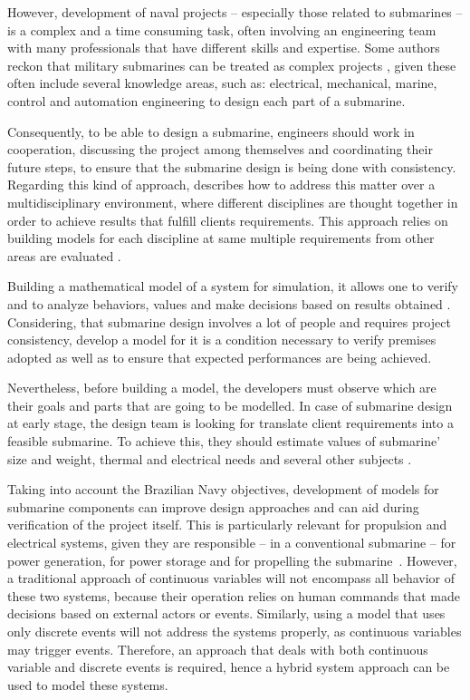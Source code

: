 \documentclass[10pt,fleqn,a4paper,twoside]{article}
\begin{document}
	However, development of naval projects -- especially those related to submarines -- is a complex and a time consuming task, often involving an engineering team with many professionals that have different skills and expertise. Some authors reckon that military submarines can be treated as complex projects \citep{Chalfant2015} \citep{Cooper2017}, given these often include several knowledge areas, such as: electrical, mechanical, marine, control and automation engineering to design each part of a submarine.
	
	Consequently, to be able to design a submarine, engineers should work in cooperation, discussing the project among themselves and coordinating their future steps, to ensure that the submarine design is being done with consistency. Regarding this kind of approach, \citet{Langland2015} describes how to address this matter over a multidisciplinary environment, where different disciplines are thought together in order to achieve results that fulfill clients requirements. This approach relies on building models for each discipline at same multiple requirements from other areas are evaluated \citet{Chalfant2017b}.
	
	Building a mathematical model of a system for simulation, it allows one to verify and to analyze behaviors, values and make decisions based on results obtained \citep{Chung2004}. Considering, that submarine design involves a lot of people and requires project consistency, develop a model for it is a condition necessary to verify premises adopted as well as to ensure that expected performances are being achieved.
	
	Nevertheless, before building a model, the developers must observe which are their goals and parts that are going to be modelled. In case of submarine design at early stage, the design team is looking for translate client requirements into a feasible submarine. To achieve this, they should estimate values of submarine' size and weight, thermal and electrical needs and several other subjects \citet{Pereira2016}.
	
	Taking into account the Brazilian Navy objectives, development of models for submarine components can improve design approaches and can aid during verification of the project itself. This is particularly relevant for propulsion and electrical systems, given they are responsible -- in a conventional submarine -- for power generation, for power storage and for propelling the submarine~\citet{Pereira2016}. However, a traditional approach of continuous variables will not encompass all behavior of these two systems, because their operation relies on human commands that made decisions based on external actors or events. Similarly, using a model that uses only discrete events will not address the systems properly, as continuous variables may trigger events. Therefore, an approach that deals with both continuous variable and discrete events is required, hence a hybrid system approach can be used to model these systems.
	
\end{document}
